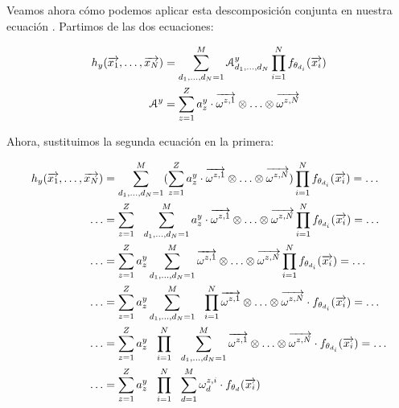 Veamos ahora cómo podemos aplicar esta descomposición conjunta en nuestra ecuación . Partimos de las dos ecuaciones:

\begin{equation}
\begin{split}
    h_y(\overrightarrow{x_1}, \ldots, \overrightarrow{x_N}) &= \sum_{d_1, \ldots, d_N = 1}^{M} \mathcal{A}^y_{d_1, \ldots, d_N} \prod_{i = 1}^N f_{\theta_{d_i}}(\overrightarrow{x_i}) \\
    \mathcal{A}^y &= \sum_{z = 1}^Z a_z^y \cdot \overrightarrow{\omega^{z, 1}} \otimes \ldots \otimes \overrightarrow{\omega^{z, N}} \\
\end{split}
\end{equation}

Ahora, sustituimos la segunda ecuación en la primera:

\begin{equation}
\begin{split}
    h_y(\overrightarrow{x_1}, \ldots, \overrightarrow{x_N}) &= \sum_{d_1, \ldots, d_N = 1}^{M} (\sum_{z = 1}^Z a_z^y \cdot \overrightarrow{\omega^{z, 1}} \otimes \ldots \otimes \overrightarrow{\omega^{z, N}}) \prod_{i = 1}^N f_{\theta_{d_i}}(\overrightarrow{x_i}) = \ldots \\
    \ldots &=  \sum_{z = 1}^Z \ \  \sum_{d_1, \ldots, d_N = 1}^{M} a_z^y \cdot \overrightarrow{\omega^{z, 1}} \otimes \ldots \otimes \overrightarrow{\omega^{z, N}} \prod_{i = 1}^N f_{\theta_{d_i}}(\overrightarrow{x_i}) = \ldots \\
    \ldots &=  \sum_{z = 1}^Z a_z^y \sum_{d_1, \ldots, d_N = 1}^{M} \overrightarrow{\omega^{z, 1}} \otimes \ldots \otimes \overrightarrow{\omega^{z, N}} \prod_{i = 1}^N f_{\theta_{d_i}}(\overrightarrow{x_i}) = \ldots \\
    \ldots &=  \sum_{z = 1}^Z a_z^y \sum_{d_1, \ldots, d_N = 1}^{M} \ \  \prod_{i = 1}^N \overrightarrow{\omega^{z, 1}} \otimes \ldots \otimes \overrightarrow{\omega^{z, N}} \cdot f_{\theta_{d_i}}(\overrightarrow{x_i}) = \ldots \\
    \ldots &=  \sum_{z = 1}^Z a_z^y \ \  \prod_{i = 1}^N \ \  \sum_{d_1, \ldots, d_N = 1}^{M}  \overrightarrow{\omega^{z, 1}} \otimes \ldots \otimes \overrightarrow{\omega^{z, N}} \cdot f_{\theta_{d_i}}(\overrightarrow{x_i}) = \ldots \\
    \ldots &=  \sum_{z = 1}^Z a_z^y \ \  \prod_{i = 1}^N \ \  \sum_{d = 1}^{M} \omega^{z, i}_d \cdot f_{\theta_{d}}(\overrightarrow{x_i})
\end{split}
\end{equation}

